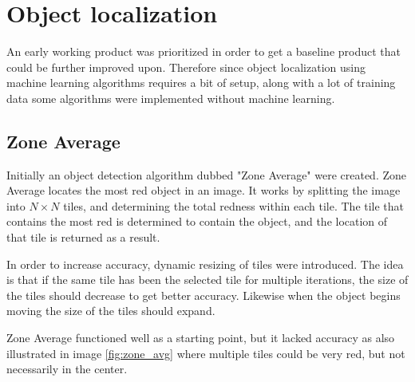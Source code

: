 \section{Object localization}\label{Design:ObjectLocalization}
An early working product was prioritized in order to get a baseline product that could be further improved upon.
Therefore since object localization using machine learning algorithms requires a bit of setup, along with a lot of training data some algorithms were implemented without machine learning.

\subsection{Zone Average}
Initially an object detection algorithm dubbed "Zone Average" were created.
Zone Average locates the most red object in an image.
It works by splitting the image into $N\times N$ tiles, and determining the total redness within each tile.
The tile that contains the most red is determined to contain the object, and the location of that tile is returned as a result.

In order to increase accuracy, dynamic resizing of tiles were introduced.
The idea is that if the same tile has been the selected tile for multiple iterations, the size of the tiles should decrease to get better accuracy.
Likewise when the object begins moving the size of the tiles should expand.


Zone Average functioned well as a starting point, but it lacked accuracy as also illustrated in image \ref{fig:zone_avg} where multiple tiles could be very red, but not necessarily in the center.

